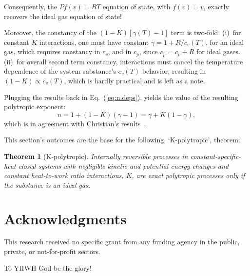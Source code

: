 \documentclass[fleqn,11pt]{SelfArx}
\newtheorem{theorem}{Theorem}
\begin{document}
    Consequently, the $Pf(v) = RT$ equation of state, with $f(v)  =  v$,  exactly  recovers  the
    ideal gas equation of state!

    Moreover, the constancy of the $(1 - K)[\gamma(T) - 1]$ term is two-fold:  (i)~for  constant
    $K$ interactions, one must have constant $\gamma = 1 + R/c_v(T)$, for an  ideal  gas,  which
    requires constancy in $c_v$, and in $c_p$, since $c_p = c_v + R$ for ideal  gases.  (ii)~for
    overall second term constancy, interactions must cancel the temperature  dependence  of  the
    system substance's $c_v(T)$ behavior, resulting in $(1 - K) \propto c_v(T)$, which is hardly
    practical and is left as a note.

    Plugging the results back in  Eq.~(\ref{eq:n.deps}),  yields  the  value  of  the  resulting
    polytropic exponent:
    \begin{equation}
        n = 1 + (1 - K)(\gamma - 1) = \gamma + K(1 - \gamma),
        \label{eq:n.final}
    \end{equation}
    \noindent        which        is        in        agreement         with         Christian's
    results~\cite{2012-ChristiansJ-IntJMechEngEduc}.

    This section's outcomes are the base for the following, `K-polytropic', theorem:

    \begin{theorem}[K-polytropic]\label{theo:K.poly}
        Internally reversible processes in constant-specific-heat closed systems with negligible
        kinetic and potential energy changes and constant heat-to-work ratio interactions,  $K$,
        are exact polytropic processes only if the substance is an ideal gas.
    \end{theorem}

\section*{Acknowledgments}

    This research received no specific grant from any funding agency in the public, private,  or
    not-for-profit sectors.

    To YHWH God be the glory!





\end{document}

